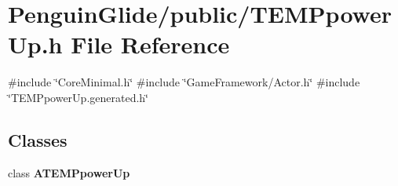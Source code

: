 \section{Penguin\+Glide/public/\+T\+E\+M\+Ppower\+Up.h File Reference}
\label{_t_e_m_ppower_up_8h}
{\ttfamily \#include \char`\"{}Core\+Minimal.\+h\char`\"{}}\newline
{\ttfamily \#include \char`\"{}Game\+Framework/\+Actor.\+h\char`\"{}}\newline
{\ttfamily \#include \char`\"{}T\+E\+M\+Ppower\+Up.\+generated.\+h\char`\"{}}\newline
\subsection*{Classes}
\begin{DoxyCompactItemize}
\item 
class \textbf{ A\+T\+E\+M\+Ppower\+Up}
\end{DoxyCompactItemize}
